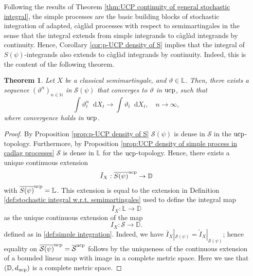 \documentclass[11pt,a4paper,twoside,openany]{report}
\numberwithin{equation}{section}
\newcommand{\diff}{\mathop{}\!\mathrm{d}}
\theoremstyle{plain} %
\newtheorem{theorem}{Theorem}[section]
\theoremstyle{definition} %
\theoremstyle{remark} %
\begin{document}
Following the results of Theorem \ref{thm:UCP continuity of general stochastic integral}, the simple processes are the basic building blocks of stochastic integration of adapted, càglàd processes with respect to semimartingales in the sense that the integral extends from simple integrands to càglàd integrands by continuity. Hence, Corollary \ref{cor:p-UCP density of S} implies that the integral of \(S(\psi)\)-integrands also extends to càglàd integrands by continuity. Indeed, this is the content of the following theorem.
\begin{theorem}\label{thm:Approx of stoch. Integrals}
    Let \(X\) be a classical semimartingale, and \(\vartheta\in \mathbb{L}\). Then, there exists a sequence \((\vartheta^n)_{n\in\mathbb{N}}\) in \(\mathcal{S}(\psi)\) that converges to \(\vartheta\) in \(\rm{ucp}\), such that
    \begin{equation*}
        \int \vartheta_t^n\diff X_t \to \int \vartheta_t\diff X_t,\quad n\to\infty,
    \end{equation*}
    where convergence holds in \(\rm{ucp}\).
\end{theorem}
\begin{proof}
 By Proposition \ref{prop:p-UCP density of S} \(\mathcal{S}(\psi)\) is dense in \(\mathcal{S}\) in the \(\rm{ucp}\)-topology. Furthermore, by Proposition \ref{prop:UCP density of simple process in cadlag processes} \(\mathcal{S}\) is dense in \(\mathbb{L}\) for the \(\rm{ucp}\)-topology. Hence, there exists a unique continuous extension 
    \begin{equation*}
        \tilde{I}_X:\overline{S(\psi)}^{\rm{ucp}}\to\mathbb{D}
    \end{equation*} 
    with \(\overline{S(\psi)}^{\rm{ucp}}=\mathbb{L}\). This extension is equal to the extension in Definition \ref{def:stochastic integral w.r.t. semimartingales} used to define the integral map
    \begin{equation*}
        \overline{I}_X:\mathbb{L}\to\mathbb{D}
    \end{equation*} 
    as the unique continuous extension of the map 
    \begin{equation*}
        I_X:\mathcal{S}\to \mathbb{D}.
    \end{equation*}
    defined as in \eqref{def:simple integration}.
    Indeed, we have
 \( \overline{I}_X|_{\mathcal{S}(\psi)}=\widetilde{I}_X|_{\mathcal{S}(\psi)}\); hence equality on \(\overline{\mathcal{S}(\psi)}^{\rm{ucp}}=\overline{\mathcal{S}}^{\rm{ucp}}\) follows by the uniqueness of the continuous extension of a bounded linear map with image in a complete metric space. Here we use that \((\mathbb{D},d_{\rm{ucp}})\) is a complete metric space.
\end{proof}
\end{document}
